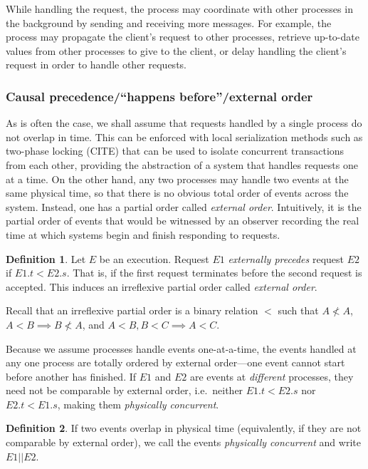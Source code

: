 \documentclass[]             %
{NASA}                       %
\theoremstyle{definition}
\newtheorem{definition}{Definition}[section]
\begin{document}
While handling the request, the process may coordinate with other
processes in the background by sending and receiving more messages. For
example, the process may propagate the client's request to other
processes, retrieve up-to-date values from other processes to give to
the client, or delay handling the client's request in order to handle
other requests.

\hypertarget{causal-precedencehappens-beforeexternal-order}{%
\subsubsection{Causal precedence/``happens before''/external
order}\label{causal-precedencehappens-beforeexternal-order}}

As is often the case, we shall assume that requests handled by a single
process do not overlap in time. This can be enforced with local
serialization methods such as two-phase locking (CITE) that can be used
to isolate concurrent transactions from each other, providing the
abstraction of a system that handles requests one at a time. On the
other hand, any two processes may handle two events at the same physical
time, so that there is no obvious total order of events across the
system. Instead, one has a partial order called \emph{external order}.
Intuitively, it is the partial order of events that would be witnessed
by an observer recording the real time at which systems begin and finish
responding to requests.

\begin{definition}
Let $E$ be an execution. Request $E1$ \emph{externally precedes}
request $E2$ if $E1.t < E2.s$. That is, if the first request
terminates before the second request is accepted. This induces an
irreflexive partial order called \emph{external order}.
\end{definition}

Recall that an irreflexive partial order is a binary relation \(<\) such
that \(A \not < A\), \(A < B \implies B \not < A\), and
\(A < B, B < C \implies A < C\).

Because we assume processes handle events one-at-a-time, the events
handled at any one process are totally ordered by external order---one
event cannot start before another has finished. If \(E1\) and \(E2\) are
events at \emph{different} processes, they need not be comparable by
external order, i.e.~neither \(E1.t < E2.s\) nor \(E2.t < E1.s\), making
them \emph{physically concurrent}.

\begin{definition}
If two events overlap in physical time
(equivalently, if they are not comparable by external order), we call the events \emph{physically concurrent} and
write $E1 || E2$.
\end{definition}
\end{document}
